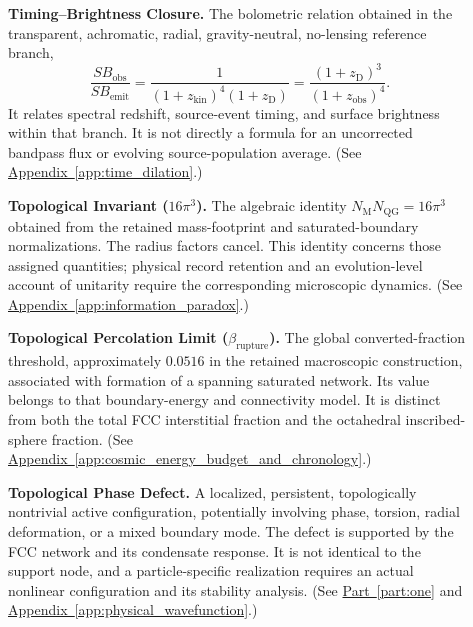 \begin{description}
\item[] \begin{minipage}[t]{\linewidth}
\textbf{Timing--Brightness Closure.} The bolometric relation obtained in the transparent, achromatic, radial, gravity-neutral, no-lensing reference branch,
\[
 \frac{SB_{\mathrm{obs}}}{SB_{\mathrm{emit}}}
 =\frac{1}{(1+z_{\mathrm{kin}})^4(1+z_{\mathrm D})}
 =\frac{(1+z_{\mathrm D})^3}{(1+z_{\mathrm{obs}})^4}.
\]
It relates spectral redshift, source-event timing, and surface brightness within that branch. It is not directly a formula for an uncorrected bandpass flux or evolving source-population average.
(See \hyperref[app:time_dilation]{Appendix~\ref*{app:time_dilation}}.)
\end{minipage}

\item[] \begin{minipage}[t]{\linewidth}
\textbf{Topological Invariant ($16\pi^3$).} The algebraic identity $N_{\mathrm M}N_{\mathrm{QG}}=16\pi^3$ obtained from the retained mass-footprint and saturated-boundary normalizations. The radius factors cancel. This identity concerns those assigned quantities; physical record retention and an evolution-level account of unitarity require the corresponding microscopic dynamics.
(See \hyperref[app:information_paradox]{Appendix~\ref*{app:information_paradox}}.)
\end{minipage}

\item[] \begin{minipage}[t]{\linewidth}
\textbf{Topological Percolation Limit ($\beta_{\mathrm{rupture}}$).} The global converted-fraction threshold, approximately $0.0516$ in the retained macroscopic construction, associated with formation of a spanning saturated network. Its value belongs to that boundary-energy and connectivity model. It is distinct from both the total FCC interstitial fraction and the octahedral inscribed-sphere fraction.
(See \hyperref[app:cosmic_energy_budget_and_chronology]{Appendix~\ref*{app:cosmic_energy_budget_and_chronology}}.)
\end{minipage}

\item[] \begin{minipage}[t]{\linewidth}
\textbf{Topological Phase Defect.} A localized, persistent, topologically nontrivial active configuration, potentially involving phase, torsion, radial deformation, or a mixed boundary mode. The defect is supported by the FCC network and its condensate response. It is not identical to the support node, and a particle-specific realization requires an actual nonlinear configuration and its stability analysis.
(See \hyperref[part:one]{Part~\ref*{part:one}} and \hyperref[app:physical_wavefunction]{Appendix~\ref*{app:physical_wavefunction}}.)
\end{minipage}


\end{description}
